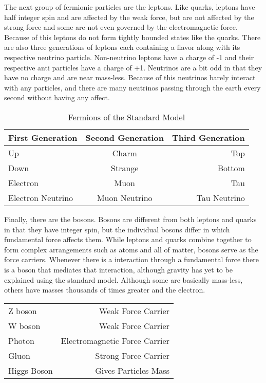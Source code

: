 The next group of fermionic particles are the leptons. Like quarks, leptons have half integer spin and are affected by the weak force, but are not affected by the strong force and some are not even governed by the electromagnetic force. Because of this leptons do not form tightly bounded states like the quarks. There are also three generations of leptons each containing a flavor along with its respective neutrino particle. Non-neutrino leptons have a charge of -1 and their respective anti particles have a charge of +1. Neutrinos are a bit odd in that they have no charge and are near mass-less. Because of this neutrinos barely interact with any particles, and there are many neutrinos passing through the earth every second without having any affect.

\begin{table}
\caption{Fermions of the Standard Model}
\label{tab:fermions}
\begin{center}
\begin{tabular}{l c r}\hline\hline
	First Generation & Second Generation & Third Generation \\ \hline
	Up & Charm & Top \\
	Down & Strange & Bottom \\ \hline
	Electron & Muon & Tau \\
	Electron Neutrino & Muon Neutrino & Tau Neutrino \\ \hline\hline
\end{tabular}
\end{center}
\end{table}

Finally, there are the bosons. Bosons are different from both leptons and quarks in that they have integer spin, but the individual bosons differ in which fundamental force affects them. While leptons and quarks combine together to form complex arrangements such as atoms and all of matter, bosons serve as the force carriers. Whenever there is a interaction through a fundamental force there is a boson that mediates that interaction, although gravity has yet to be explained using the standard model. Although some are basically mass-less, others have masses thousands of times greater and the electron. 
 
\begin{center}
\begin{tabular}{l r}
	Z boson & Weak Force Carrier \\
	W boson & Weak Force Carrier \\
	Photon & Electromagnetic Force Carrier \\
	Gluon & Strong Force Carrier \\
	Higgs Boson & Gives Particles Mass \\
\end{tabular}
\end{center}

